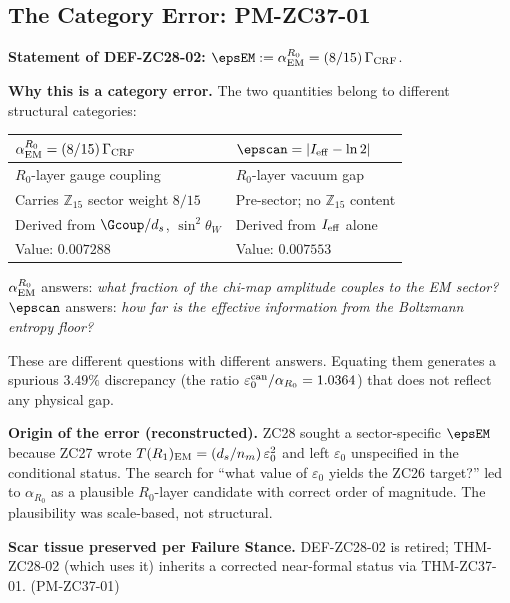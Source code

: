 \documentclass[12pt, a4paper]{article}
\begin{document}
\subsection{The Category Error: PM-ZC37-01}
\label{sec:category-error}

\begin{openqbox}[title={PM-ZC37-01: DEF-ZC28-02 was a category
  error --- retired as Phase Misalignment}]
\label{pm:zc37-01}
\textbf{Statement of DEF-ZC28-02:}
$\epsEM := \alpha_{\rm EM}^{R_0} = (8/15)\,\Gamma_{\rm CRF}$.

\medskip
\textbf{Why this is a category error.}
The two quantities belong to different structural categories:

\begin{center}
{\small
\renewcommand{\arraystretch}{1.30}
\begin{tabular}{p{5.5cm}p{5.5cm}}
\toprule
$\alpha_{\rm EM}^{R_0} = (8/15)\,\Gamma_{\rm CRF}$ &
$\epscan = |I_{\rm eff} - \ln 2|$ \\
\midrule
$R_0$-layer gauge coupling & $R_0$-layer vacuum gap \\
Carries $\mathbb{Z}_{15}$ sector weight $8/15$ & Pre-sector; no $\mathbb{Z}_{15}$ content \\
Derived from $\Gcoup/d_s$, $\sin^2\theta_W$ & Derived from $I_{\rm eff}$ alone \\
Value: $0.007288$ & Value: $0.007553$ \\
\bottomrule
\end{tabular}
}
\end{center}

$\alpha_{\rm EM}^{R_0}$ answers: \emph{what fraction of the
chi-map amplitude couples to the EM sector?}\\
$\epscan$ answers: \emph{how far is the effective information
from the Boltzmann entropy floor?}

These are different questions with different answers.
Equating them generates a spurious $3.49\%$ discrepancy
(the ratio $\varepsilon_0^{\rm can}/\alpha_{R_0} = 1.0364$)
that does not reflect any physical gap.

\medskip
\textbf{Origin of the error (reconstructed).}
ZC28 sought a sector-specific $\epsEM$ because ZC27 wrote
$T(R_1)_{\rm EM} = (d_s/n_m)\,\varepsilon_0^2$ and left
$\varepsilon_0$ unspecified in the conditional status.
The search for ``what value of $\varepsilon_0$ yields the
ZC26 target?'' led to $\alpha_{R_0}$ as a plausible
$R_0$-layer candidate with correct order of magnitude.
The plausibility was scale-based, not structural.

\medskip
\textbf{Scar tissue preserved per Failure Stance.}
DEF-ZC28-02 is retired; THM-ZC28-02 (which uses it)
inherits a corrected near-formal status via THM-ZC37-01.
\hfill\textup{(PM-ZC37-01)}
\end{openqbox}
\end{document}
